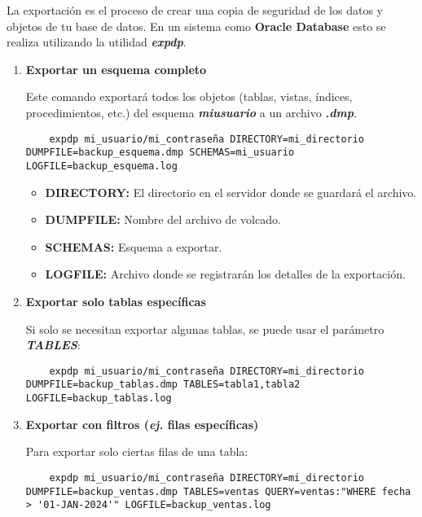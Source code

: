 La exportación es el proceso de crear una copia de seguridad de los datos y objetos de tu base de datos. En un sistema como \textbf{Oracle Database} esto se realiza utilizando la utilidad \textbf{\emph{expdp}}.

\begin{enumerate}
  \item \textbf{Exportar un esquema completo}
  
  Este comando exportará todos los objetos (tablas, vistas, índices, procedimientos, etc.) del esquema \textbf{\emph{mi{\textunderscore}usuario}} a un archivo \textbf{\emph{.dmp}}.

  \begin{lstlisting}
    expdp mi_usuario/mi_contraseña DIRECTORY=mi_directorio DUMPFILE=backup_esquema.dmp SCHEMAS=mi_usuario LOGFILE=backup_esquema.log
  \end{lstlisting}

  \begin{itemize}
    \item \textbf{DIRECTORY:} El directorio en el servidor donde se guardará el archivo.
    \item \textbf{DUMPFILE:} Nombre del archivo de volcado.
    \item \textbf{SCHEMAS:} Esquema a exportar.
    \item \textbf{LOGFILE:} Archivo donde se registrarán los detalles de la exportación.
  \end{itemize}

  \item \textbf{Exportar solo tablas específicas}
  
  Si solo se necesitan exportar algunas tablas, se puede usar el parámetro \textbf{\emph{TABLES}}:

  \begin{lstlisting}
    expdp mi_usuario/mi_contraseña DIRECTORY=mi_directorio DUMPFILE=backup_tablas.dmp TABLES=tabla1,tabla2 LOGFILE=backup_tablas.log
  \end{lstlisting}

  \item \textbf{Exportar con filtros (\textit{ej.} filas específicas)}
  
  Para exportar solo ciertas filas de una tabla:

  \begin{lstlisting}
    expdp mi_usuario/mi_contraseña DIRECTORY=mi_directorio DUMPFILE=backup_ventas.dmp TABLES=ventas QUERY=ventas:"WHERE fecha > '01-JAN-2024'" LOGFILE=backup_ventas.log
  \end{lstlisting}
\end{enumerate}
